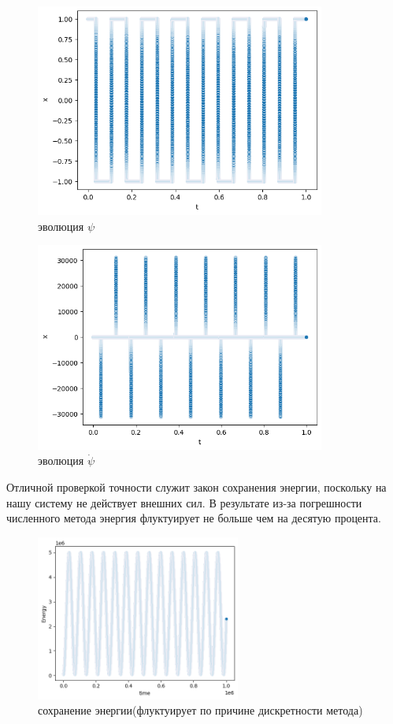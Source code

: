 \documentclass[a4paper, 12pt]{article}
\begin{document}
    \begin{figure}[H]
  \centering
  \includegraphics[width = 0.85\textwidth, height = 0.20\textheight]{pictures/data/image copy 5.png}
  \caption{эволюция $\psi$}
 \end{figure}

    \begin{figure}[H]
  \centering
  \includegraphics[width = 0.85\textwidth, height = 0.20\textheight]{pictures/data/image copy 6.png}
  \caption{эволюция $\dot{\psi}$}
 \end{figure}
    
Отличной проверкой точности служит закон сохранения энергии, поскольку на нашу систему не действует внешних сил. В результате из-за погрешности численного метода энергия флуктуирует не больше чем на десятую процента.
\begin{figure}[H]
    \centering
    \includegraphics[width = 0.6\textwidth, height = 0.20\textheight]{pictures/data/energy.png}
    \caption{сохранение энергии(флуктуирует по причине дискретности метода)}
   \end{figure}
\end{document}

